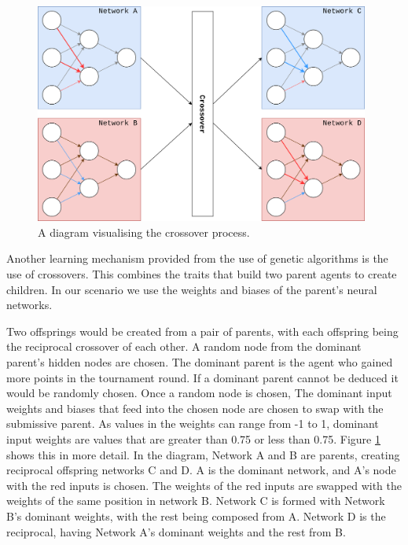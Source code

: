 \documentclass[12pt,a4paper]{article}
\begin{document}
        
    \begin{figure}
        \centering
        \includegraphics[width=110mm]{crossover.png}
        \caption{A diagram visualising the crossover process.\label{crossoverpic}}
    \end{figure}

    Another learning mechanism provided from the use of genetic algorithms is the use of crossovers. This combines the traits that build two parent agents to create children. In our scenario we use the weights and biases of the parent's neural networks.

    Two offsprings would be created from a pair of parents, with each offspring being the reciprocal crossover of each other. 
    A random node from the dominant parent's hidden nodes are chosen. The dominant parent is the agent who gained more points in the tournament round. If a dominant parent cannot be deduced it would be randomly chosen. Once a random node is chosen, The dominant input weights and biases that feed into the chosen node are chosen to swap with the submissive parent. As values in the weights can range from -1 to 1, dominant input weights are values that are greater than 0.75 or less than 0.75. 
    Figure \ref{crossoverpic} shows this in more detail. In the diagram, Network A and B are parents, creating reciprocal offspring networks C and D. A is the dominant network, and A's node with the red inputs is chosen. The weights of the red inputs are swapped with the weights of the same position in network B. Network C is formed with Network B's dominant weights, with the rest being composed from A. Network D is the reciprocal, having Network A's dominant weights and the rest from B.
\end{document}
